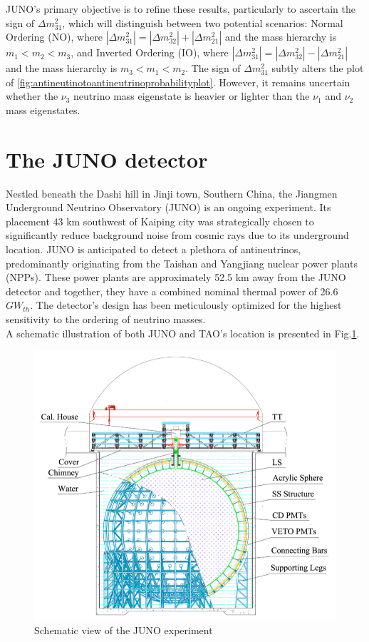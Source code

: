 JUNO's primary objective is to refine these results, particularly to ascertain the sign of $\Delta m_{31}^2$, which will distinguish between two potential scenarios: Normal Ordering (NO), where $\left|\Delta m_{31}^2\right|=\left|\Delta m_{32}^2\right|+\left|\Delta m_{21}^2\right|$ and the mass hierarchy is $m_1<m_2<m_3$, and Inverted Ordering (IO), where $\left|\Delta m_{31}^2\right|=\left|\Delta m_{32}^2\right|-\left|\Delta m_{21}^2\right|$ and the mass hierarchy is $m_3<m_1<m_2$. The sign of $\Delta m_{31}^2$ subtly alters the plot of \ref{fig:antineutinotoantineutrinoprobabilityplot}. However, it remains uncertain whether the $\nu_3$ neutrino mass eigenstate is heavier or lighter than the $\nu_1$ and $\nu_2$ mass eigenstates.


\section{The JUNO detector}

Nestled beneath the Dashi hill in Jinji town, Southern China, the Jiangmen Underground Neutrino Observatory (JUNO) is an ongoing experiment. Its placement 43 km southwest of Kaiping city was strategically chosen to significantly reduce background noise from cosmic rays due to its underground location. JUNO is anticipated to detect a plethora of antineutrinos, predominantly originating from the Taishan and Yangjiang nuclear power plants (NPPs). These power plants are approximately 52.5 km away from the JUNO detector and together, they have a combined nominal thermal power of 26.6 $GW_{th}$. The detector's design has been meticulously optimized for the highest sensitivity to the ordering of neutrino masses.\\

A schematic illustration of both JUNO and TAO's location is presented in Fig.\ref{fig:junoschemeexperiment}.


\begin{figure}[h]
	\centering
	\includegraphics[width=0.5\linewidth]{Images/juno_scheme_experiment}
	\caption[JUNO scheme experiment]{Schematic view of the JUNO experiment}
	\label{fig:junoschemeexperiment}
\end{figure}


